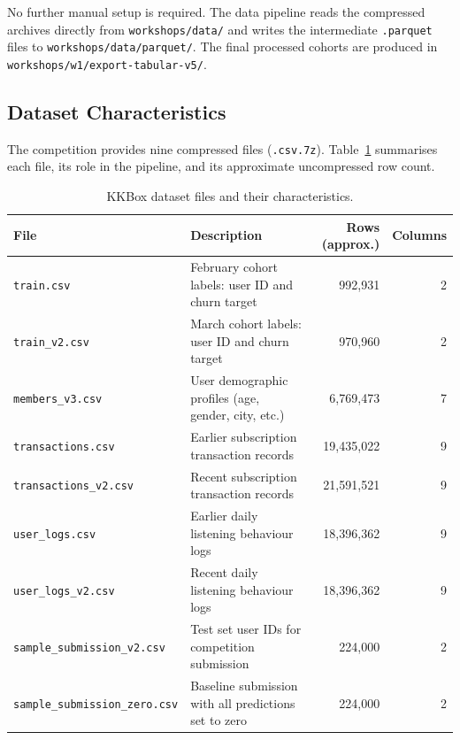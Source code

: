 \documentclass{article}
\begin{document}
No further manual setup is required. The data pipeline reads the compressed archives directly from \texttt{workshops/data/} and writes the intermediate \texttt{.parquet} files to \texttt{workshops/data/parquet/}. The final processed cohorts are produced in \texttt{workshops/w1/export-tabular-v5/}.

\subsection{Dataset Characteristics}

The competition provides nine compressed files (\texttt{.csv.7z}). Table~\ref{tab:files} summarises each file, its role in the pipeline, and its approximate uncompressed row count.

\begin{table}[H]
\centering
\begin{tabularx}{\textwidth}{lXrr}
\toprule
\textbf{File} & \textbf{Description} & \textbf{Rows (approx.)} & \textbf{Columns} \\
\midrule
\texttt{train.csv}                    & February cohort labels: user ID and churn target        & 992{,}931      & 2  \\
\texttt{train\_v2.csv}                & March cohort labels: user ID and churn target           & 970{,}960      & 2  \\
\texttt{members\_v3.csv}              & User demographic profiles (age, gender, city, etc.)     & 6{,}769{,}473  & 7  \\
\texttt{transactions.csv}             & Earlier subscription transaction records                & 19{,}435{,}022 & 9  \\
\texttt{transactions\_v2.csv}         & Recent subscription transaction records                 & 21{,}591{,}521 & 9  \\
\texttt{user\_logs.csv}               & Earlier daily listening behaviour logs                  & 18{,}396{,}362 & 9  \\
\texttt{user\_logs\_v2.csv}           & Recent daily listening behaviour logs                   & 18{,}396{,}362 & 9  \\
\texttt{sample\_submission\_v2.csv}   & Test set user IDs for competition submission            & 224{,}000      & 2  \\
\texttt{sample\_submission\_zero.csv} & Baseline submission with all predictions set to zero    & 224{,}000      & 2  \\
\bottomrule
\end{tabularx}
\caption{KKBox dataset files and their characteristics.}
\label{tab:files}
\end{table}
\end{document}
